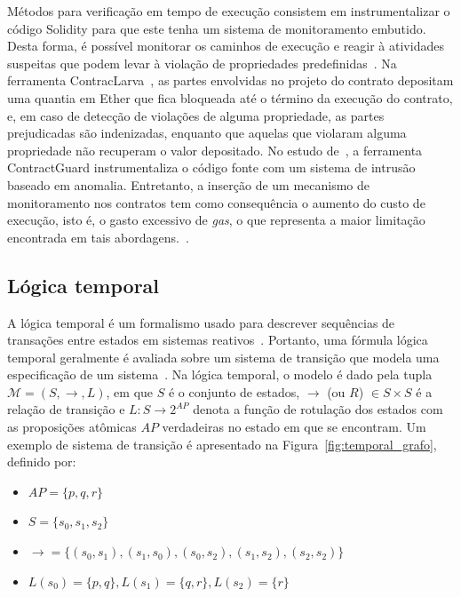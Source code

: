 Métodos para verificação em tempo de execução consistem em instrumentalizar o código Solidity para que este tenha um sistema de monitoramento embutido. Desta forma, é possível monitorar os caminhos de execução e reagir à atividades suspeitas que podem levar à violação de propriedades predefinidas~\cite{wang2019contractguard-19, azzopardi2018monitoring-61, li2020securing-77}. Na ferramenta ContracLarva~\cite{azzopardi2018monitoring-61}, as partes envolvidas no projeto do contrato depositam uma quantia em Ether que fica bloqueada até o término da execução do contrato, e, em caso de detecção de violações de alguma propriedade, as partes prejudicadas são indenizadas, enquanto que aquelas que violaram alguma propriedade não recuperam o valor depositado. No estudo de~, a ferramenta ContractGuard instrumentaliza o código fonte com um sistema de intrusão baseado em anomalia. Entretanto, a inserção de um mecanismo de monitoramento nos contratos tem como consequência o aumento do custo de execução, isto é, o gasto excessivo de \textit{gas}, o que representa a maior limitação encontrada em tais abordagens.~\cite{wang2019contractguard-19, azzopardi2018monitoring-61}.

\subsection{Lógica temporal} \label{tex:fund:logicas-temporais}

A lógica temporal é um formalismo usado para descrever sequências de transações entre estados em sistemas reativos~\cite{clarke2018model}. Portanto, uma fórmula lógica temporal geralmente é avaliada sobre um sistema de transição que modela uma especificação de um sistema~\cite{clarke2018model}. Na lógica temporal, o modelo é dado pela tupla $\mathcal{M} = (S, \rightarrow, L)$, em que $S$ é o conjunto de estados, $\rightarrow$ (ou $R$) $ \in S \times S$ é a relação de transição e $L \colon S \rightarrow 2^{AP}$ denota a função de rotulação dos estados com as proposições atômicas $AP$ verdadeiras no estado em que se encontram. Um exemplo de sistema de transição é apresentado na Figura~\ref{fig:temporal_grafo}, definido por:
\begin{itemize}
	\item $AP = \{p,q,r\}$
	\item $S = \{s_{0}, s_{1}, s_{2}\}$
	\item $\rightarrow = \{(s_{0}, s_{1}), (s_{1}, s_{0}), (s_{0}, s_{2}), (s_{1}, s_{2}), (s_{2}, s_{2})\}$
	\item $L(s_{0}) = \{p,q\}, L(s_{1}) = \{q, r\}, L(s_{2}) = \{r\}$
\end{itemize}

